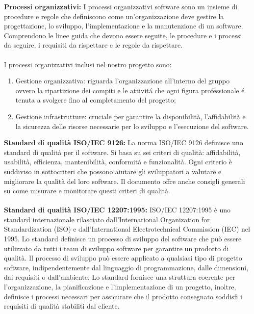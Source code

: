 \textbf{Processi organizzativi:}
I processi organizzativi software sono un insieme di procedure e regole che definiscono come un'organizzazione deve gestire la progettazione, lo sviluppo, l'implementazione e la manutenzione di un software.
Comprendono le linee guida che devono essere seguite, le procedure e i processi da seguire, i requisiti da rispettare e le regole da rispettare.
\\\\
I processi organizzativi inclusi nel nostro progetto sono:
\begin{enumerate}
    \item Gestione organizzativa: riguarda l'organizzazione all'interno del gruppo ovvero la ripartizione dei compiti e le attivitá che ogni figura professionale é tenuta a svolgere fino al 
    completamento del progetto;
    \item Gestione infrastrutture: cruciale per garantire la disponibilità, l'affidabilità e la sicurezza delle risorse necessarie per lo sviluppo e l'esecuzione del software.
\end{enumerate}
\textbf{Standard di qualità ISO/IEC 9126:} La norma ISO/IEC 9126 definisce uno standard di qualità per il software. 
Si basa su sei criteri di qualità: affidabilità, usabilità, efficienza, mantenibilità, conformità e funzionalità. 
Ogni criterio è suddiviso in sottocriteri che possono aiutare gli sviluppatori a valutare e migliorare la qualità del loro software. 
Il documento offre anche consigli generali su come misurare e monitorare questi criteri di qualità.
\\\\
\textbf{Standard di qualità ISO/IEC 12207:1995:} ISO/IEC 12207:1995 è uno standard internazionale rilasciato dall'International Organization 
for Standardization (ISO) e dall'International Electrotechnical Commission (IEC) nel 1995. 
Lo standard definisce un processo di sviluppo del software che può essere utilizzato da tutti i team di sviluppo software per garantire 
un prodotto di qualità. Il processo di sviluppo può essere applicato a qualsiasi tipo di progetto software, indipendentemente dal 
linguaggio di programmazione, dalle dimensioni, dai requisiti o dall'ambiente. 
Lo standard fornisce una struttura coerente per l'organizzazione, la pianificazione e l'implementazione di un progetto, 
inoltre, definisce i processi necessari per assicurare che il prodotto consegnato soddisfi i requisiti di qualità stabiliti dal cliente.